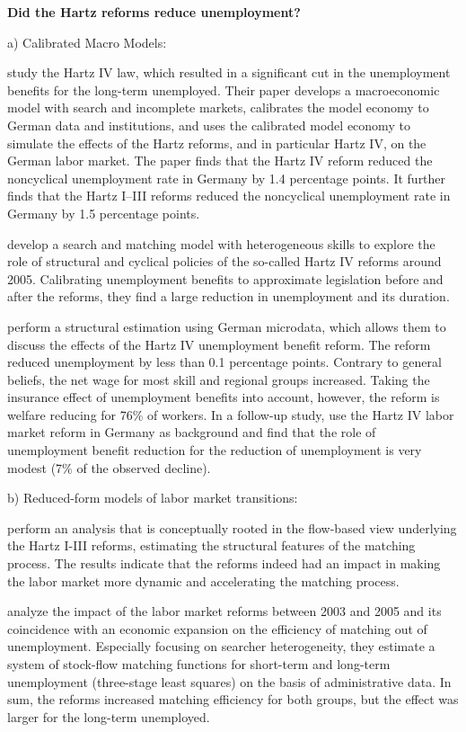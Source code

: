 \documentclass[12pt, a4paper]{article}
\begin{document}
\textbf{Did the Hartz reforms reduce unemployment?}

a) Calibrated Macro Models: 

\cite{KrebsScheffer13} study the Hartz IV law, which resulted in a significant cut in the unemployment benefits for the long-term unemployed. Their paper develops a macroeconomic model with search and incomplete markets, calibrates the model economy to German data and institutions, and uses the calibrated model economy to simulate the effects of the Hartz reforms, and in particular Hartz IV, on the German labor market. The paper finds that the Hartz IV reform reduced the noncyclical unemployment rate in Germany by 1.4 percentage points. It further finds that the Hartz I–III reforms reduced the noncyclical unemployment rate in Germany by 1.5 percentage points.

\cite{KrauseUhlig12} develop a search and matching model with heterogeneous skills to explore the role of structural and cyclical policies of the so-called Hartz IV reforms around 2005. Calibrating unemployment benefits to approximate legislation before and after the reforms, they find a large reduction in unemployment and its duration.

\cite{LaunovWalde13a} perform a structural estimation using German microdata, which allows them to discuss the effects of the Hartz IV unemployment benefit reform. The reform reduced unemployment by less than 0.1 percentage points. Contrary to general beliefs, the net wage for most skill and regional groups increased. Taking the insurance effect of unemployment benefits into account, however, the reform is welfare reducing for 76\% of workers. In a follow-up study, \cite{LaunovWalde13b} use the Hartz IV labor market reform in Germany as background and find that the role of unemployment benefit reduction for the reduction of unemployment is very modest (7\% of the observed decline).

b) Reduced-form models of labor market transitions:

\cite{FahrSunde09} perform an analysis that is conceptually rooted in the flow-based view underlying the Hartz I-III reforms, estimating the structural features of the matching process. The results indicate that the reforms indeed had an impact in making the labor market more dynamic and accelerating the matching process.

\cite{KlingerRothe12} analyze the impact of the labor market reforms between 2003 and 2005 and its coincidence with an economic expansion on the efficiency of matching out of unemployment. Especially focusing on searcher heterogeneity, they estimate a system of stock-flow matching functions for short-term and long-term unemployment (three-stage least squares) on the basis of administrative data. In sum, the reforms increased matching efficiency for both groups, but the effect was larger for the long-term unemployed.
\end{document}
